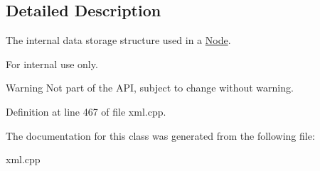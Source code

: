 \subsection{Detailed Description}
The internal data storage structure used in a \hyperlink{classphys_1_1xml_1_1Node}{Node}. \begin{DoxyInternal}{For internal use only.}
\begin{DoxyWarning}{Warning}
Not part of the API, subject to change without warning. 
\end{DoxyWarning}
\end{DoxyInternal}


Definition at line 467 of file xml.cpp.



The documentation for this class was generated from the following file:\begin{DoxyCompactItemize}
\item 
xml.cpp\end{DoxyCompactItemize}

